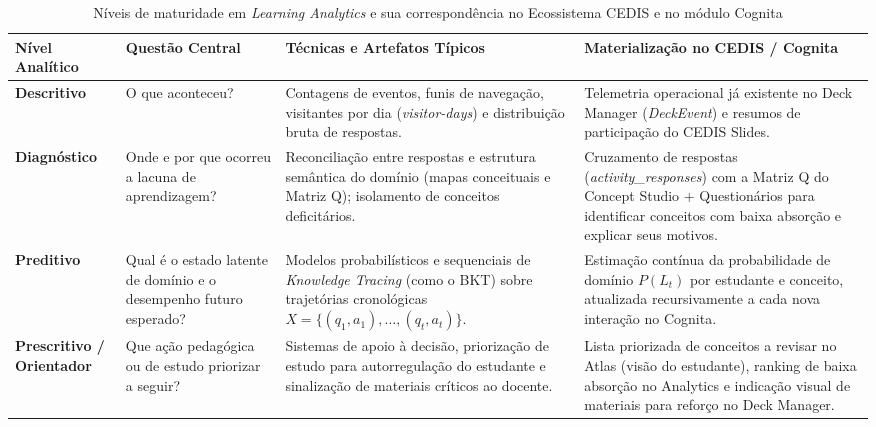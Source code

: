 \begin{table}[H]
\caption{Níveis de maturidade em \textit{Learning Analytics} e sua correspondência no Ecossistema CEDIS e no módulo Cognita}
\label{tab:niveis-learning-analytics}
\centering
\begin{tabularx}{\textwidth}{>{\raggedright\arraybackslash}p{2.7cm}>{\raggedright\arraybackslash}p{2.8cm}>{\raggedright\arraybackslash}X>{\raggedright\arraybackslash}X}
\hline
\textbf{Nível Analítico} & \textbf{Questão Central} & \textbf{Técnicas e Artefatos Típicos} & \textbf{Materialização no CEDIS / Cognita} \\
\hline
\textbf{Descritivo} \cite{siemens_learning_2012, lang_handbook_2017} & O que aconteceu? & Contagens de eventos, funis de navegação, visitantes por dia (\textit{visitor-days}) e distribuição bruta de respostas. & Telemetria operacional já existente no Deck Manager (\textit{DeckEvent}) e resumos de participação do CEDIS Slides. \\
\hline
\textbf{Diagnóstico} \cite{gaevic_learning_2015, cao_multi-granularity_2025} & Onde e por que ocorreu a lacuna de aprendizagem? & Reconciliação entre respostas e estrutura semântica do domínio (mapas conceituais e Matriz Q); isolamento de conceitos deficitários. & Cruzamento de respostas (\textit{activity\_responses}) com a Matriz Q do Concept Studio + Questionários para identificar conceitos com baixa absorção e explicar seus motivos. \\
\hline
\textbf{Preditivo} \cite{corbett_knowledge_1994, pelanek_bayesian_2017} & Qual é o estado latente de domínio e o desempenho futuro esperado? & Modelos probabilísticos e sequenciais de \textit{Knowledge Tracing} (como o BKT) sobre trajetórias cronológicas $X = \{(q_1, a_1), \ldots, (q_t, a_t)\}$. & Estimação contínua da probabilidade de domínio $P(L_t)$ por estudante e conceito, atualizada recursivamente a cada nova interação no Cognita. \\
\hline
\textbf{Prescritivo / Orientador} \cite{clow_learning_2012, liao_naviedu_2026} & Que ação pedagógica ou de estudo priorizar a seguir? & Sistemas de apoio à decisão, priorização de estudo para autorregulação do estudante e sinalização de materiais críticos ao docente. & Lista priorizada de conceitos a revisar no Atlas (visão do estudante), ranking de baixa absorção no Analytics e indicação visual de materiais para reforço no Deck Manager. \\
\hline
\end{tabularx}
\end{table}
